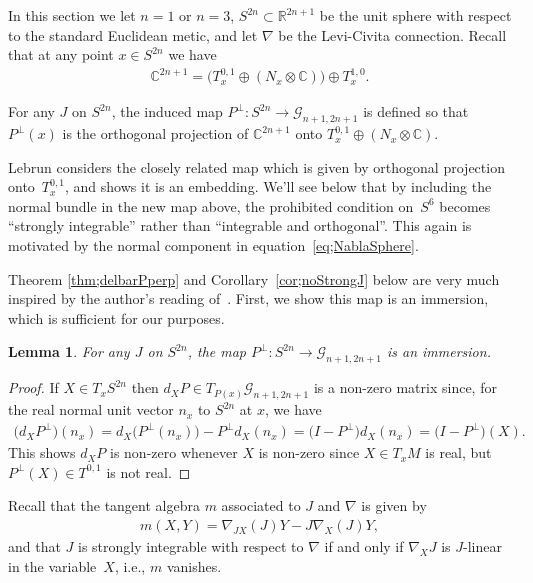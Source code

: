 \documentclass[pdftex]{sigma}
\newtheorem{lem}[thm]{Lemma}
\numberwithin{equation}{section}
\newcommand{\R}{\mathbb{R}}
\newcommand{\CC}{\mathbb{C}}
\newcommand{\cG}{{\mathcal G}}
\begin{document}
In this section we let $n=1$ or $n=3$, $S^{2n} \subset \R^{2n+1}$ be the unit sphere with respect to the standard Euclidean metic, and let $\nabla$ be the Levi-Civita connection. Recall that at any point $x \in S^{2n}$ we have
\begin{gather*}
\CC^{2n+1} = \big( T^{0,1}_x \oplus (N_x \otimes \CC) \big) \oplus T^{1,0}_x.
\end{gather*}

\begin{defn}For any $J$ on $S^{2n}$, the induced map $P^\perp\colon S^{2n} \to \cG_{n+1,2n+1}$ is defined so that~$P^\perp(x)$ is the orthogonal projection of $\CC^{2n+1}$ onto $T^{0,1}_x \oplus (N_x \otimes \CC)$.
\end{defn}

Lebrun \cite{L} considers the closely related map which is given by orthogonal projection onto~$T^{0,1}_x$, and shows it is an embedding. We'll see below that by including the normal bundle in the new map above, the prohibited condition on~$S^6$ becomes ``strongly integrable'' rather than ``integrable and orthogonal''. This again is motivated by the normal component in equation~\eqref{eq;NablaSphere}.

Theorem \ref{thm;delbarPperp} and Corollary~\ref{cor;noStrongJ} below are very much inspired by the author's reading of~\cite{L}. First, we show this map is an immersion, which is sufficient for our purposes.

\begin{lem} For any $J$ on $S^{2n}$, the map $P^\perp\colon S^{2n} \to \cG_{n+1,2n+1}$ is an immersion.
\end{lem}

\begin{proof}If $X \in T_x S^{2n}$ then $d_X P \in T_{P(x)} \cG_{n+1,2n+1}$ is a non-zero matrix since, for the real normal unit vector $n_x$ to $S^{2n}$ at $x$, we have
\begin{gather*}
\big(d_XP^\perp\big)(n_x) = d_X\big(P^\perp(n_x)\big) - P^\perp d_X(n_x) = \big(I-P^\perp \big) d_X(n_x) = \big(I-P^\perp\big)(X).
\end{gather*}
This shows $d_X P$ is non-zero whenever $X$ is non-zero since $X \in T_xM$ is real, but $P^\perp(X) \in T^{0,1}$ is not real.
\end{proof}

Recall that the tangent algebra $m$ associated to $J$ and $\nabla$ is given by
\begin{gather*}
m(X,Y) = \nabla_{JX} (J)Y - J \nabla_X (J) Y,
\end{gather*}
and that $J $ is strongly integrable with respect to $\nabla$ if and only if $\nabla_X J$ is $J$-linear in the variable~$X$, i.e., $m$ vanishes.
\end{document}
